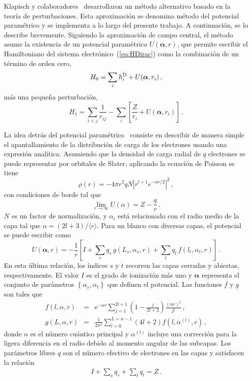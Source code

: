 Klapisch y colaboradores~\cite{Klapisch:71,Klapisch:67,Klapisch:77,
BarShalom:01} desarrollaron un método alternativo basado en la teoría de 
perturbaciones. Esta aproximación se denomina método del potencial 
paramétrico y se implementa a lo largo del presente trabajo. A 
continuación, se lo describe brevemente. 
Siguiendo la aproximación de campo central, el método asume la 
existencia de un potencial paramétrico $U(\boldsymbol{\alpha},r)$, que 
permite escribir el Hamiltoniano del sistema 
electrónico~(\ref{eq:HDirac}) como la combinación de un término de orden 
cero,
\begin{equation}
 H_0 = \sum_i h_i^{\mbox{\scriptsize D}} + U(\boldsymbol{\alpha},r_i)\,,
\end{equation}
más una pequeña perturbación,
\begin{equation}
 H_1 = \sum_{i<j}\frac{1}{r_{ij}}
 - \sum_i \left[ \frac{Z}{r_i} + U(\boldsymbol{\alpha},r_i) \right]\,.
\end{equation}

La idea detrás del potencial paramétrico~\cite{Klapisch:77} consiste en
describir de manera simple el apantallamiento de la distribución de 
carga de los electrones usando una expresión analítica. Asumiendo que 
la densidad de carga radial de $q$ electrones se puede representar por 
orbitales de Slater, aplicando la ecuación de Poisson se tiene
\begin{equation}
\rho(r) = -4\pi r^2 qN\left|r^{l+1}e^{-\alpha r/2}\right|^2\,,
\end{equation} 
con condiciones de borde tal que
\begin{equation}
\lim_{r\rightarrow\infty} U(\alpha)=Z-\frac{q}{r}\,.
\end{equation} 
$N$ es un factor de normalización, y $\alpha_i$ está relacionado 
con el radio medio de la capa tal que $\alpha=(2l+3)/\langle r\rangle$. 
Para un blanco con diversas capas, el potencial se puede escribir como
\begin{equation}
U(\boldsymbol{\alpha},r)=-\frac{1}{r} \left[I+\sum_s q_s\, g(L_s,\alpha_s,r) 
+ \sum_t q_t\,f(l_t,\alpha_t,r)\right]\,.
\label{eq:potparam}
\end{equation}
En esta última relación, los índices $s$ y $t$ recorren las capas 
cerradas y abiertas, respectivamente. El valor $I$ es el grado de 
ionización más uno y $\boldsymbol{\alpha}$ representa el conjunto de 
parámetros $\left\{\alpha_s,\alpha_t\right\}$ que definen el potencial.
Las funciones $f$ y $g$ son tales que
\begin{eqnarray}
f(l,\alpha,r)&=&\mathrm{e}^{-\alpha r}\sum_{j=1}^{2l+1}
\left(1-\frac{j}{2l+2}\right)\frac{(\alpha r)^j}{j!}\,,\\
g(L,\alpha,r)&=&\frac{1}{2n^2}\sum_{l=0}^{L=n-1}
(4l+2)f\left(l,\alpha^{(l)},r\right)\,,
\end{eqnarray}
donde $n$ es el número cuántico principal y $\alpha^{(l)}$ incluye una
corrección para la ligera diferencia en el radio debido al momento 
angular de las subcapas. Los parámetros libres $q$ son el número 
efectivo de electrones en las capas y satisfacen la relación 
\begin{eqnarray}
I+\sum_s q_s+\sum_t q_t=Z\,.
\end{eqnarray}

